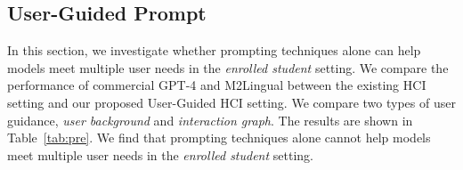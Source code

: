 \begin{table}[t]
  \begin{minipage}{0.24\linewidth}
    \hspace{-0.6cm}
    \label{tab:pre}
    \centering
  \end{minipage}
  \hspace{0.2cm}
  \begin{minipage}{0.27\linewidth}
    \hspace{-0.4cm}
    \label{tab:guided}
    \centering
  \end{minipage}
\end{table}


\subsection{User-Guided Prompt}
\label{subsec:prompt}

In this section, we investigate whether prompting techniques alone can help models meet multiple user needs in the \textit{enrolled student} setting.
We compare the performance of commercial GPT-4 and M2Lingual between the existing HCI setting and our proposed User-Guided HCI setting.
We compare two types of user guidance, \textit{user background} and \textit{interaction graph}.
The results are shown in Table~\ref{tab:pre}.
We find that prompting techniques alone cannot help models meet multiple user needs in the \textit{enrolled student} setting.
